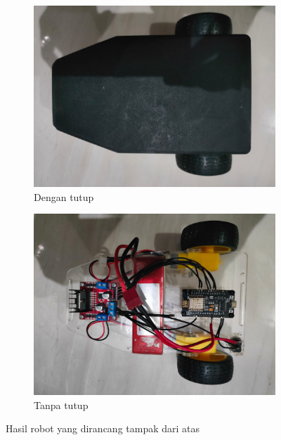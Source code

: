 \begin{figure}[H]
  \begin{subfigure}{0.8\textwidth}
    \centering
    \includegraphics[width=\linewidth]{../Gambar/dengantutup.jpg}
    \caption{Dengan tutup}
    \label{fig:dengantutup}
  \end{subfigure}
  \begin{subfigure}{0.8\textwidth}
    \centering
    \includegraphics[width=\linewidth]{../Gambar/tanpatutup.jpg}
    \caption{Tanpa tutup}
    \label{fig:tanpatutup}
  \end{subfigure}
  \centering
  \caption{Hasil robot yang dirancang tampak dari atas}
  \label{fig:hasilrobot}
\end{figure}

